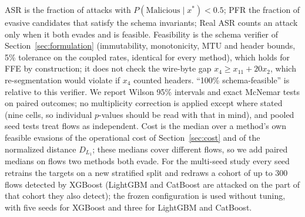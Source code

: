 ASR is the fraction of attacks with $P(\text{Malicious}\mid x^*)<0.5$; PFR the fraction of evasive candidates that satisfy the schema invariants; Real ASR counts an attack only when it both evades and is feasible. Feasibility is the schema verifier of Section~\ref{sec:formulation} (immutability, monotonicity, MTU and header bounds, 5\% tolerance on the coupled rates, identical for every method), which holds for FFE by construction; it does not check the wire-byte gap $x_4\ge x_{11}+20x_2$, which re-segmentation would violate if $x_4$ counted headers. ``100\% schema-feasible'' is relative to this verifier. We report Wilson 95\% intervals and exact McNemar tests on paired outcomes; no multiplicity correction is applied except where stated (nine cells, so individual $p$-values should be read with that in mind), and pooled seed tests treat flows as independent. Cost is the median over a method's own feasible evasions of the operational cost of Section~\ref{sec:cost} and of the normalized distance $D_{L_1}$; these medians cover different flows, so we add paired medians on flows two methods both evade. For the multi-seed study every seed retrains the targets on a new stratified split and redraws a cohort of up to 300 flows detected by XGBoost (LightGBM and CatBoost are attacked on the part of that cohort they also detect); the frozen configuration is used without tuning, with five seeds for XGBoost and three for LightGBM and CatBoost.
